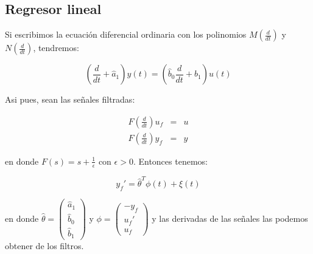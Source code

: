         \subsection{Regresor lineal}

            Si escribimos la ecuación diferencial ordinaria con los polinomios $M \left( \frac{d}{dt} \right)$ y $N \left( \frac{d}{dt} \right)$, tendremos:

            \begin{equation*}
                \left( \frac{d}{dt} + \hat{a}_1 \right) y(t) = \left( \hat{b}_0 \frac{d}{dt} + \hat{b}_1 \right) u(t)
            \end{equation*}

            Asi pues, sean las señales filtradas:

            \begin{eqnarray*}
                F \left( \frac{d}{dt} \right) u_f & = & u \\
                F \left( \frac{d}{dt} \right) y_f & = & y
            \end{eqnarray*}

            en donde $F(s) = s + \frac{1}{\epsilon}$ con $\epsilon > 0$.
            Entonces tenemos:

            \begin{equation*}
                y_f' = \hat{\theta}^T \phi(t) + \xi(t)
            \end{equation*}

            en donde $\hat{\theta} = \begin{pmatrix} \hat{a}_1 \\ \hat{b}_0 \\ \hat{b}_1 \end{pmatrix}$ y $\phi = \begin{pmatrix} -y_f \\ u_f' \\ u_f \end{pmatrix}$ y las derivadas de las señales las podemos obtener de los filtros.

